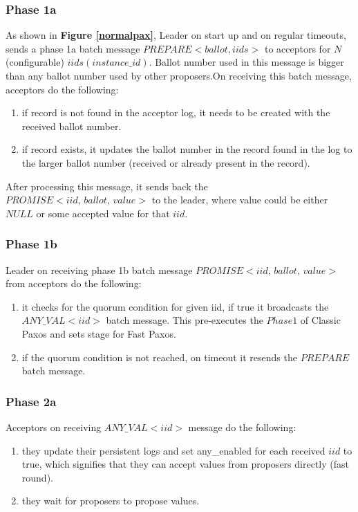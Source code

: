 \subsubsection{Phase 1a}
As shown in \textbf{Figure \ref{normalpax}}, Leader on start up and on regular timeouts, sends a phase 1a batch message $PREPARE<ballot, iids>$ to acceptors for $N$ (configurable) $iids(instance\_id)$. Ballot number used in this message is bigger than any ballot number used by other proposers.On receiving this batch message, acceptors do the following:
\begin{enumerate}
\item if record is not found in the acceptor log, it needs to be created with the received ballot number. 
\item if record exists, it updates the ballot number in the record found in the log to the larger ballot number (received or already present in the record).
\end{enumerate}
\noindent
After processing this message, it sends back the $PROMISE<iid, \, ballot, \, value>$ to the leader, where value could be either $NULL$ or some accepted value for that $iid$.\\

\subsubsection{Phase 1b}
\noindent 
Leader on receiving phase 1b batch message $PROMISE<iid, \, ballot, \, value>$ from acceptors do the following:
\begin{enumerate}
\item it checks for the quorum condition for given iid, if true it broadcasts the $ANY\_VAL<iid>$ batch message. This pre-executes the $Phase1$ of Classic Paxos and sets stage for Fast Paxos.
\item if the quorum condition is not reached, on timeout it resends the $PREPARE$ batch message.
\end{enumerate}

\subsubsection{Phase 2a}
\noindent
Acceptors on receiving $ANY\_VAL<iid>$ message do the following:
\begin{enumerate}
\item they update their persistent logs and set any\_enabled for each received $iid$ to true, which signifies that they can accept values from proposers directly (fast round).
\item they wait for proposers to propose values.
\end{enumerate}

